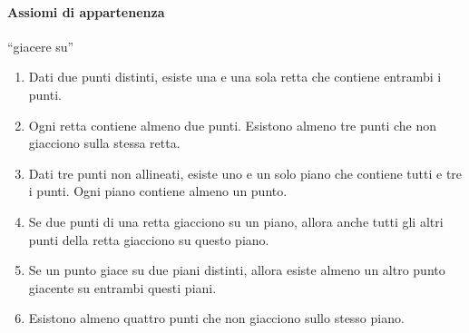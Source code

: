 \paragraph{Assiomi di appartenenza} ``giacere su''
\begin{enumerate}[label=\Roman{*}., nosep]
\item Dati due punti distinti, esiste una e una sola retta che 
contiene entrambi i punti.
\item Ogni retta contiene almeno due punti. Esistono almeno tre punti 
che non giacciono sulla stessa retta.
\item Dati tre punti non allineati, esiste uno e un solo piano che 
contiene tutti e tre i punti. Ogni piano contiene almeno un punto. 
\item Se due punti di una retta giacciono su un piano, allora anche 
tutti gli altri punti della retta giacciono su questo piano. 
\item Se un punto giace su due piani distinti, allora esiste almeno 
un altro punto giacente su entrambi questi piani.
\item Esistono almeno quattro punti che non giacciono sullo stesso 
piano.
\end{enumerate}


\begin{inaccessibleblock}
 \begin{minipage}[b]{.32\textwidth}
 \begin{center} \end{center}
 \end{minipage}
 \begin{minipage}[b]{.32\textwidth}
 \begin{center} \end{center}
 \end{minipage}
 \begin{minipage}[b]{.32\textwidth}
 \begin{center} \end{center}
 \end{minipage}
\end{inaccessibleblock}

